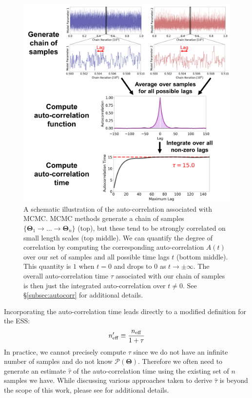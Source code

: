 \documentclass[12pt, titlepage]{article}
\newcommand{\params}{\ensuremath{\boldsymbol\Theta}}
\newcommand{\posterior}{\ensuremath{\mathcal{P}}}
\begin{document}
\begin{figure}
\begin{center}
\includegraphics[width=\textwidth]{figures/fig9.png}
\end{center}
\caption{A schematic illustration of the auto-correlation
associated with MCMC. MCMC methods generate a chain of
samples $\{ \params_1 \rightarrow \dots \rightarrow \params_n \}$ (top),
but these tend to be strongly correlated on small length scales (top middle).
We can quantify the degree of correlation by
computing the corresponding auto-correlation $A(t)$
over our set of samples and all possible time lags $t$
(bottom middle). This quantity is $1$ when $t=0$
and drops to $0$ as $t \rightarrow \pm \infty$. The overall
auto-correlation time $\tau$ associated with our chain of
samples is then just the integrated auto-correlation over $t \neq 0$.
See \S\ref{subsec:autocorr} for additional details.
}\label{fig:autocorr}
\end{figure}

Incorporating the auto-correlation time leads directly
to a modified definition for the ESS:
\begin{equation}
    n_{\rm eff}' \equiv \frac{n_{\rm eff}}{1 + \tau}
\end{equation}
In practice, we cannot precisely compute $\tau$ since
we do not have an infinite number of samples and do not know
$\posterior(\params)$. Therefore we often need to
generate an estimate $\hat{\tau}$ of the auto-correlation time
using the existing set of $n$ samples we have. While discussing
various approaches taken to derive $\hat{\tau}$ is beyond the
scope of this work, please see \citet{brooks+11} 
for additional details.
\end{document}
